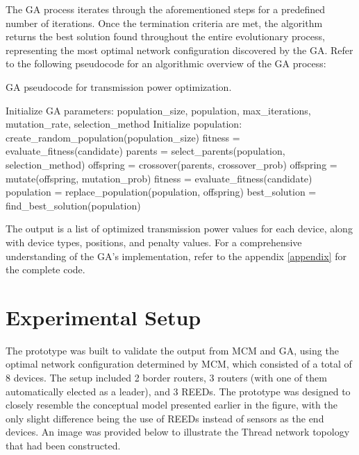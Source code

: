 The \gls{GA} process iterates through the aforementioned steps for a predefined number of iterations. Once the termination criteria are met, the algorithm returns the best solution found throughout the entire evolutionary process, representing the most optimal network configuration discovered by the \gls{GA}. Refer to the following pseudocode for an algorithmic overview of the \acrlong{GA} process:

\begin{algorithm}[H]
    \caption{\gls{GA} pseudocode for transmission power optimization.}
    \label{alg:genetic_algorithm}
    \begin{algorithmic}[1]
    \STATE Initialize \gls{GA} parameters: population\_size, population, max\_iterations, mutation\_rate, selection\_method
    \STATE Initialize population: create\_random\_population(population\_size)
        \STATE fitness = evaluate\_fitness(candidate)
    \ENDFOR
        \STATE parents = select\_parents(population, selection\_method)
        \STATE offspring = crossover(parents, crossover\_prob)
        \STATE offspring = mutate(offspring, mutation\_prob)
            \STATE fitness = evaluate\_fitness(candidate)
        \ENDFOR
        \STATE population = replace\_population(population, offspring)
    \ENDFOR
    \STATE best\_solution = find\_best\_solution(population)
    \end{algorithmic}
\end{algorithm}

The output is a list of optimized transmission power values for each device, along with device types, positions, and penalty values. For a comprehensive understanding of the \acrlong{GA}'s implementation, refer to the appendix \ref{appendix} for the complete code.

\section{Experimental Setup}

The prototype was built to validate the output from \gls{MCM} and \gls{GA}, using the optimal network configuration determined by \gls{MCM}, which consisted of a total of 8 devices. The setup included 2 border routers, 3 routers (with one of them automatically elected as a leader), and 3 \glspl{REED}. The prototype was designed to closely resemble the conceptual model presented earlier in the figure, with the only slight difference being the use of \glspl{REED} instead of sensors as the end devices. An image was provided below to illustrate the Thread network topology that had been constructed.

